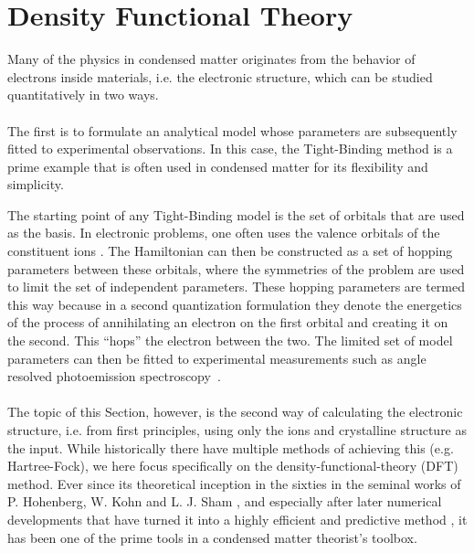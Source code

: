 \chapter{Density Functional Theory \label{sec:DFT}}
Many of the physics in condensed matter originates from the behavior of electrons inside materials, i.e. the electronic structure, which can be studied quantitatively in two ways.
\\\\
The first is to formulate an analytical model whose parameters are subsequently fitted to experimental observations. 
In this case, the Tight-Binding method is a prime example that is often used in condensed matter for its flexibility and simplicity.

The starting point of any Tight-Binding model is the set of orbitals that are used as the basis.
In electronic problems, one often uses the valence orbitals of the constituent ions \cite{Bloch1929,Slater1954}.
The Hamiltonian can then be constructed as a set of hopping parameters between these orbitals, where the symmetries of the problem are used to limit the set of independent parameters.
These hopping parameters are termed this way because in a second quantization formulation they denote the energetics of the process of annihilating an electron on the first orbital and creating it on the second.
This ``hops'' the electron between the two.
The limited set of model parameters can then be fitted to experimental measurements such as angle resolved photoemission spectroscopy~\cite{Damascelli2004}.
\\\\
The topic of this Section, however, is the second way of calculating the electronic structure, i.e. from first principles, using only the ions and crystalline structure as the input. 
While historically there have multiple methods of achieving this (e.g. Hartree-Fock), we here focus specifically on the density-functional-theory (DFT) method.
Ever since its theoretical inception in the sixties in the seminal works of P. Hohenberg, W. Kohn and L. J. Sham  \cite{Hohenberg1964,Kohn1965}, and especially after later numerical developments that have turned it into a highly efficient and predictive method \cite{Hamann1979,Louie1982,Vanderbilt1990,Joubert1999,Perdew1985,Perdew1986,Perdew1993}, it has been one of the prime tools in a condensed matter theorist's toolbox.

